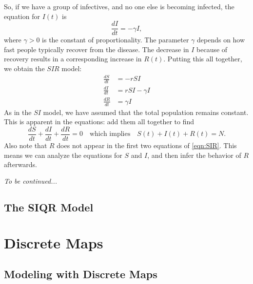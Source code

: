 \documentclass[reqno]{immbook}
\begin{document}
So, if we have a group of infectives, and no
one else is becoming infected, the equation
for $I(t)$ is
\begin{equation}
  \frac{dI}{dt} = -\gamma I,
\end{equation}
where $\gamma > 0$ is the constant of proportionality.
The parameter $\gamma$ depends on how fast people
typically recover from the disease.
The decrease in $I$ because of recovery results
in a corresponding increase in $R(t)$.
Putting this all together, we obtain the
$SIR$ model:
\begin{equation}
\begin{split}
   \frac{dS}{dt} & = -r S I \\
   \frac{dI}{dt} & = r S I - \gamma I \\
   \frac{dR}{dt} & = \gamma I
\end{split}
\label{eqn:SIR}
\end{equation}
As in the $SI$ model, we have assumed that the total
population remains constant.  This is apparent in the equations:
add them all together to find
\begin{equation}
   \frac{dS}{dt} + \frac{dI}{dt} + \frac{dR}{dt} = 0
   \quad \textrm{which implies} \quad
   S(t) + I(t) + R(t) = N.
\end{equation}
Also note that $R$ does not appear in the first two equations
of \eqref{eqn:SIR}.  This means we can analyze the equations
for $S$ and $I$, and then infer the behavior of $R$ afterwards.

\medskip
\noindent
\emph{To be continued...}


\section{The SIQR Model}
%
%
%

\chapter{Discrete Maps}
%
\section{Modeling with Discrete Maps}
%
\end{document}

